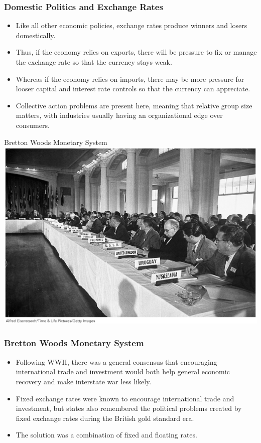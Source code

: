 \documentclass{beamer}
\begin{document}
\begin{frame} 
	\frametitle{\LARGE{Domestic Politics and Exchange Rates}}
	\begin{itemize}
		\item Like all other economic policies, exchange rates produce winners and losers domestically. \pause 
		\item Thus, if the economy relies on exports, there will be pressure to fix or manage the exchange rate so that the currency stays weak. \pause 
		\item Whereas if the economy relies on imports, there may be more pressure for looser capital and interest rate controls so that the currency can appreciate. \pause
		\item Collective action problems are present here, meaning that relative group size matters, with industries usually having an organizational edge over consumers. 
	\end{itemize}
\end{frame}

\begin{frame}{\LARGE Bretton Woods Monetary System}
	\centering
	\includegraphics[width=\textwidth,height=0.8\textheight,keepaspectratio]{Brettonwoods.jpg}
\end{frame}

\begin{frame} 
	\frametitle{\LARGE{Bretton Woods Monetary System}}
	\begin{itemize}
		\item Following WWII, there was a general consensus that encouraging international trade and investment would both help general economic recovery and make interstate war less likely. \pause
		\item Fixed exchange rates were known to encourage international trade and investment, but states also remembered the political problems created by fixed exchange rates during the British gold standard era.	\pause
		\item The solution was a combination of fixed and floating rates.
	\end{itemize}
\end{frame}
\end{document}
